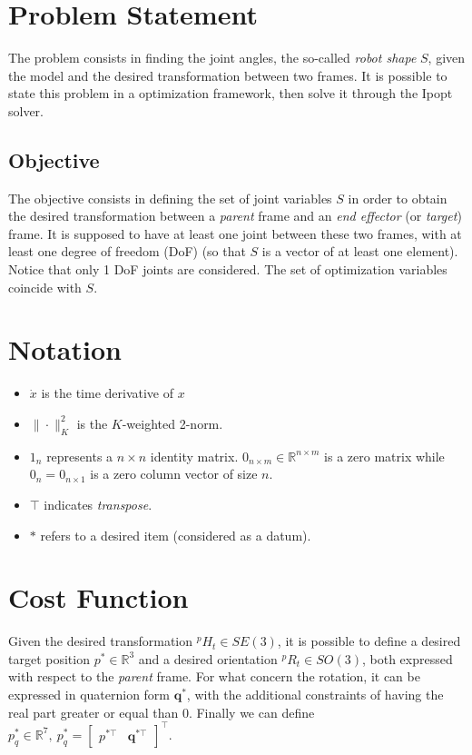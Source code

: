 \section{Problem Statement}
The problem consists in finding the joint angles, the so-called \textit{robot shape} $S$, given the model and the desired transformation between two frames. It is possible to state this problem in a optimization framework, then solve it through the Ipopt solver.

\subsection{Objective} 
The objective consists in defining the set of joint variables $S$ in order to obtain the desired transformation between a \textit{parent} frame and an \textit{end effector} (or \textit{target}) frame. It is supposed to have at least one joint between these two frames, with at least one degree of freedom (DoF) (so that $S$ is a vector of at least one element). Notice that only 1 DoF joints are considered. The set of optimization variables coincide with $S$.

\section{Notation}
\begin{itemize}
\item $\dot{x}$ is the time derivative of $x$
\item$\| \cdot\|^2_K$ is the $K$-weighted 2-norm.
\item ${1}_n$ represents a $n \times n$ identity matrix. $0_{n \times m} \in \mathbb{R}^{n\times m}$ is a zero matrix while $0_n = 0_{n \times 1}$ is a zero column vector of size $n$.
\item $\top$ indicates \textit{transpose}.
\item $*$ refers to a desired item (considered as a datum).
\end{itemize}

\section{Cost Function}
Given the desired transformation ${}^pH_t \in SE(3)$, it is possible to define a desired target position $p^*\in \mathbb{R}^3$ and a desired orientation ${}^pR_t \in SO(3)$, both expressed with respect to the \textit{parent} frame. For what concern the rotation, it can be expressed in quaternion form $\textbf{q}^*$, with the additional constraints of having the real part greater or equal than 0. Finally we can define $p_q^*\in \mathbb{R}^7,\: p_q^*=\left[\begin{smallmatrix}
p^{*\top} & \textbf{q}^{*\top}
\end{smallmatrix}\right]^\top$.

